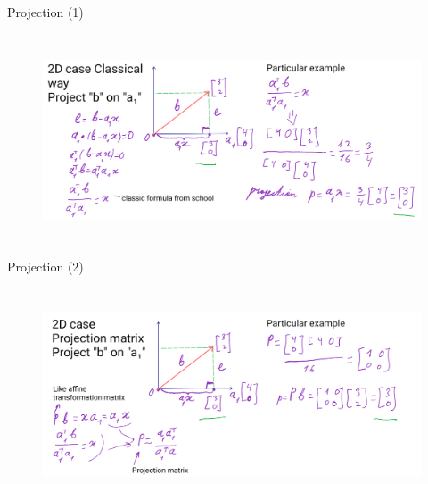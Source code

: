 \documentclass[aspectratio=169]{beamer}
\begin{document}
\begin{frame}[t]{Projection (1)}
    \framesubtitle{}
    \begin{figure}[H]
        \centering\includegraphics[height=6cm,width=1\textwidth,keepaspectratio]{AGLA2_for_slides_1.png}
        \label{fig:AGLA2_for_slides_1.png}
    \end{figure}
\end{frame}

\begin{frame}[t]{Projection (2)}
    \framesubtitle{}
    \begin{figure}[H]
        \centering\includegraphics[height=6cm,width=1\textwidth,keepaspectratio]{AGLA2_for_slides_2.png}
        \label{fig:AGLA2_for_slides_2.png}
    \end{figure}
\end{frame}
\end{document}
